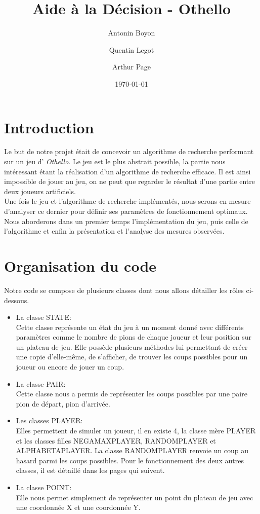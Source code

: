 \documentclass[12pt]{article}
\title{Aide à la Décision - Othello}
\author{Antonin Boyon \and Quentin Legot \and Arthur Page}
\date{\today}
\begin{document}
\maketitle
\thispagestyle{empty}
\setcounter{page}{0}
\newpage

\tableofcontents
\newpage

\section{Introduction}

Le but de notre projet était de concevoir un algorithme de recherche performant sur un jeu d' \textit{Othello}. Le jeu est le plus abstrait possible, la partie nous intéressant étant la réalisation d'un algorithme de recherche efficace. Il est ainsi impossible de jouer au jeu, on ne peut que regarder le résultat d'une partie entre deux joueurs artificiels.\\
Une fois le jeu et l'algorithme de recherche implémentés, nous serons en mesure d'analyser ce dernier pour définir ses paramètres de fonctionnement optimaux. Nous aborderons dans un premier temps l'implémentation du jeu, puis celle de l'algorithme et enfin la présentation et l'analyse des mesures observées.


\section{Organisation du code}
Notre code se compose de plusieurs classes dont nous allons détailler les rôles ci-dessous. 
\begin{itemize}
\item La classe STATE: \\ Cette classe représente un état du jeu à un moment donné avec différents paramètres comme le nombre de pions de chaque joueur et leur position sur un plateau de jeu. Elle possède plusieurs méthodes lui permettant de créer une copie d'elle-même, de s'afficher, de trouver les coups possibles pour un joueur ou encore de jouer un coup.
\item La classe PAIR: \\ Cette classe nous a permis de représenter les coups possibles par une paire pion de départ, pion d'arrivée.
\item Les classes PLAYER: \\ Elles permettent de simuler un joueur, il en existe 4, la classe mère PLAYER et les classes filles NEGAMAXPLAYER, RANDOMPLAYER et ALPHABETAPLAYER. La classe RANDOMPLAYER renvoie un coup au hasard parmi les coups possibles. Pour le fonctionnement des deux autres classes, il est détaillé dans les pages qui suivent.
\item La classe POINT: \\ Elle nous permet simplement de représenter un point du plateau de jeu avec une coordonnée X et une coordonnée Y.
\end{itemize}
\end{document}

